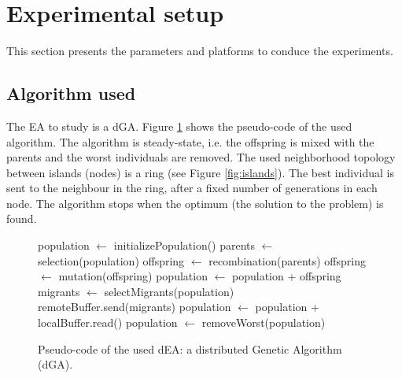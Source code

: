 \documentclass[final,1p,times]{elsarticle}
\begin{document}
\section{Experimental setup}
\label{sec:experiments}
This section presents the parameters and platforms to conduce the experiments. 



\subsection{Algorithm used}
The EA to study is a dGA. Figure \ref{fig:EA} shows the pseudo-code of the used algorithm. %
The algorithm is steady-state, i.e. the offspring is mixed with the parents and the worst individuals are removed. The used neighborhood topology between islands (nodes) is a ring (see Figure \ref{fig:islands}). The best individual is sent to the neighbour in the ring, after a fixed number of generations in each node. The algorithm stops when the optimum (the solution to the problem) is found.  %



\begin{figure}[htb]

\begin{algorithmic}
\STATE population $\gets$ initializePopulation()
    \STATE parents $\gets$ selection(population)
    \STATE offspring $\gets$ recombination(parents)
    \STATE offspring $\gets$ mutation(offspring)
    \STATE population $\gets$ population + offspring
      \STATE migrants $\gets$ selectMigrants(population)
      \STATE remoteBuffer.send(migrants)
    \ENDIF
      \STATE population $\gets$ population + localBuffer.read()
    \ENDIF
    \STATE population $\gets$ removeWorst(population)
\ENDWHILE

\end{algorithmic}
\caption{Pseudo-code of the used dEA: a distributed Genetic Algorithm (dGA).}
\label{fig:EA}
\end{figure}
\end{document}
